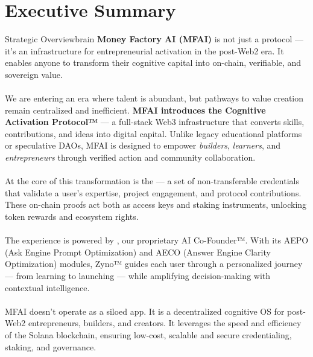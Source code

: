 \section*{Executive Summary}

\begin{mfai-box}{Strategic Overview}{brain}
\textbf{Money Factory AI (MFAI)} is not just a protocol — it’s an infrastructure for entrepreneurial activation in the post-Web2 era. It enables anyone to transform their cognitive capital into on-chain, verifiable, and sovereign value.
\end{mfai-box}

\vspace{1.5em}

\paragraph{} We are entering an era where talent is abundant, but pathways to value creation remain centralized and inefficient. \textbf{MFAI introduces the Cognitive Activation Protocol™} — a full-stack Web3 infrastructure that converts skills, contributions, and ideas into digital capital. Unlike legacy educational platforms or speculative DAOs, MFAI is designed to empower \textit{builders}, \textit{learners}, and \textit{entrepreneurs} through verified action and community collaboration.

\paragraph{} At the core of this transformation is the  — a set of non-transferable credentials that validate a user’s expertise, project engagement, and protocol contributions. These on-chain proofs act both as access keys and staking instruments, unlocking token rewards and ecosystem rights.

\paragraph{} The experience is powered by , our proprietary AI Co-Founder™. With its AEPO (Ask Engine Prompt Optimization) and AECO (Answer Engine Clarity Optimization) modules, Zyno™ guides each user through a personalized journey — from learning to launching — while amplifying decision-making with contextual intelligence.

\paragraph{} MFAI doesn’t operate as a siloed app. It is a decentralized cognitive OS for post-Web2 entrepreneurs, builders, and creators. It leverages the speed and efficiency of the Solana blockchain, ensuring low-cost, scalable and secure credentialing, staking, and governance.

